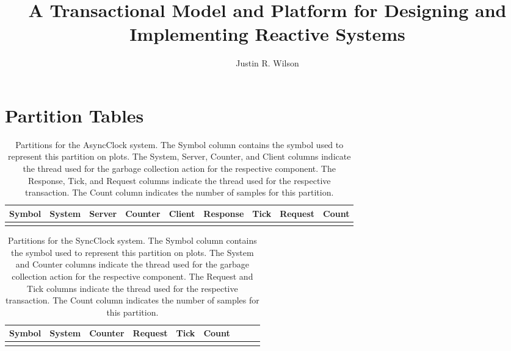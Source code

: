 \documentclass[letterpaper]{book}
\title{A Transactional Model and Platform for Designing and Implementing Reactive Systems}
\author{Justin R. Wilson}
\date{}
\begin{document}
\VerbatimFootnotes

\maketitle



\tableofcontents














{}

\appendix

\chapter{Partition Tables}

\begin{longtable}{ccccccccr}
Symbol & System & Server & Counter & Client & Response & Tick & Request & Count \\
\hline
\endhead

\caption{Partitions for the AsyncClock system.  The Symbol column contains the symbol used to represent this partition on plots.  The System, Server, Counter, and Client columns indicate the thread used for the garbage collection action for the respective component.  The Response, Tick, and Request columns indicate the thread used for the respective transaction.  The Count column indicates the number of samples for this partition.}
\label{async_partitions}
\end{longtable}

\begin{longtable}{ccccccccr}
Symbol & System & Counter & Request & Tick & Count \\
\hline
\endhead

\caption{Partitions for the SyncClock system.  The Symbol column contains the symbol used to represent this partition on plots.  The System and Counter columns indicate the thread used for the garbage collection action for the respective component.  The Request and Tick columns indicate the thread used for the respective transaction.  The Count column indicates the number of samples for this partition.}
\label{sync_partitions}
\end{longtable}
\end{document}
